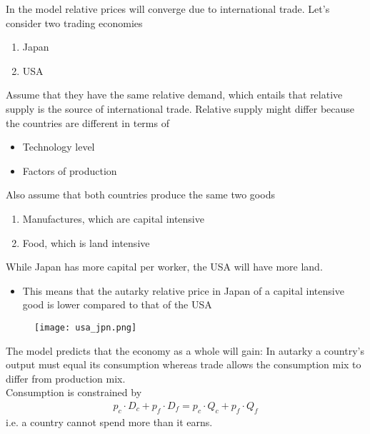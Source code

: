\documentclass{beamer}
\begin{document}
\begin{frame}
 In the model relative prices will converge due to international trade.
 Let's consider two trading economies
 \begin{enumerate}
    \item Japan
    \item USA
  \end{enumerate} 
  \medskip
  Assume that they have the same relative demand, which entails that relative supply is the source of international trade. 
  Relative supply might differ because the countries are different in terms of
 \begin{itemize}
   \item Technology level
   \item Factors of production
 \end{itemize} 
\end{frame}

\begin{frame}
  Also assume that both countries produce the same two goods
  \begin{enumerate}
    \item Manufactures, which are capital intensive
    \item Food, which is land intensive
  \end{enumerate}
  \medskip
  While Japan has more capital per worker, the USA will have more land. 
   \begin{itemize}
   \item This means that the autarky relative price in Japan of a capital intensive good is lower compared to that of the USA
 \end{itemize}
\end{frame}

\begin{frame}
  \begin{figure}
    \texttt{[image: usa\_jpn.png]}
  \end{figure}
\end{frame}

\begin{frame}
  The model predicts that the economy as a whole will gain: 
  In autarky a country's output must equal its consumption whereas trade allows the consumption mix to differ from production mix.\\
  Consumption is constrained by
  \begin{align*}
    p_c \cdot D_c + p_f \cdot D_f = p_c \cdot Q_c + p_f \cdot Q_f
  \end{align*}
  \medskip
  i.e. a country cannot spend more than it earns.  
\end{frame}
\end{document}
